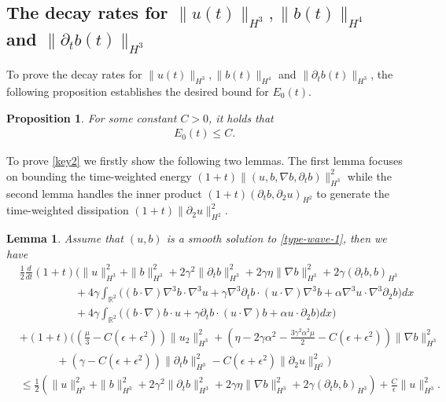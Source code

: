 \documentclass[reqno,11pt]{amsart}
\newtheorem{Prop}[Thm]{Proposition}
\newtheorem{Lem}[Thm]{Lemma}
\def\R{\mathbb R}
\numberwithin{Thm}{section}
\begin{document}
\subsection{The decay rates for $\| u(t)\|_{H^{3}},\|b(t)\|_{H^{4}}$ and $
		\|\partial_t b(t)\|_{H^{3}}$}
To prove the decay rates for $\| u(t)\|_{H^{3}},\|b(t)\|_{H^{4}}$ and $
		\|\partial_t b(t)\|_{H^{3}}$, the following proposition establishes the desired bound for ${E}_0(t)$.
\begin{Prop}\label{Prop1}
For some constant $C>0$, it holds that
\begin{align}\label{key2}
		E_0(t)\leq C.
\end{align}
\end{Prop}
 To prove \eqref{key2} we firstly show the following two lemmas. The first lemma focuses on bounding the time-weighted energy $(1+t)\|(u,b,\nabla b,\partial_tb)\|^2_{H^3}$ while the second lemma handles the inner product $(1+t)(\partial_tb,\partial_2u)_{H^2}$ to generate the time-weighted dissipation $(1+t)\|\partial_2u\|_{H^2}^2$.
 \begin{Lem}\label{key3}
Assume that $(u,b)$ is a smooth solution to \eqref{type-wave-1}, then we have
\begin{align}\label{inenergy11}
&\frac{1}{2}\frac{d}{dt}(1+t)\Big(\|u\|^2_{H^3}+\| b\|^2_{H^3}+2\gamma^2\|\partial_tb\|^2_{H^3}
+2\gamma\eta\|\nabla b\|^2_{H^3}+2\gamma(\partial_tb,b)_{H^3}\nonumber\\
&\qquad\qquad\quad+4\gamma\int_{\R^2}\big((b\cdot\nabla)\nabla^3 b\cdot\nabla^3 u+\gamma\nabla^3\partial_{t}b\cdot (u\cdot\nabla)\nabla^3 b+\alpha\nabla^3u\cdot\nabla^3\partial_2 b\big)dx\nonumber\\
&\qquad\qquad\quad +4\gamma\int_{\R^2}\big((b\cdot\nabla) b\cdot u+\gamma\partial_{t}b\cdot (u\cdot\nabla) b+\alpha u\cdot\partial_2 b\big)dx\Big)\nonumber\\
&+(1+t)\big((\frac{\mu}{3}-C(\epsilon+\epsilon^2))\|u_2\|^2_{H^3}+(\eta-2\gamma\alpha^2-\frac{3\gamma^2\alpha^2\mu}{2}-C(\epsilon+\epsilon^2))\|\nabla b\|^2_{H^3}\nonumber\\
&\qquad \ \ \ \ \ \ +(\gamma-C(\epsilon+\epsilon^2))\|\partial_{t}b\|^2_{H^3}-C(\epsilon+\epsilon^2)\|\partial_{2}u\|_{H^2}^2\big) \nonumber\\&\leq\frac{1}{2}\left(\|u\|^2_{H^3}+\| b\|^2_{H^3}+2\gamma^2\|\partial_tb\|^2_{H^3}
+2\gamma\eta\|\nabla b\|^2_{H^3}+2\gamma(\partial_t b,b)_{H^3}\right)+\frac{C}{\epsilon}\|u\|_{H^3}^2.
\end{align}
\end{Lem}
\end{document}
